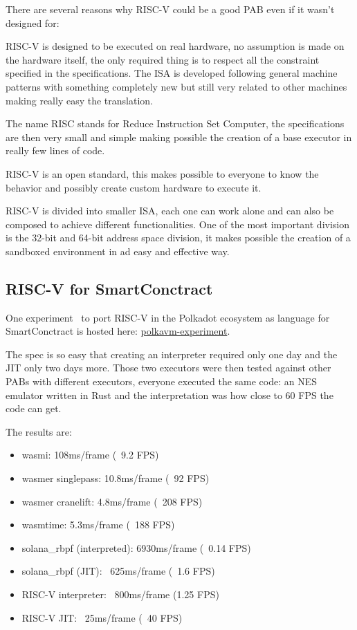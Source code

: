 There are several reasons why RISC-V could be a good PAB even if it wasn't designed for:
\begin{description}[style=nextline]
  \item[Real ISA suitable for direct native hardware implementation]
        RISC-V is designed to be executed on real hardware, no assumption is made on the hardware itself, the only required thing is to respect all the constraint specified in the specifications. The ISA is developed following general machine patterns with something completely new but still very related to other machines making really easy the translation.
  \item[RISC]
        The name RISC stands for Reduce Instruction Set Computer, the specifications are then very small and simple making possible the creation of a base executor in really few lines of code.
  \item[Completely open ISA]
        RISC-V is an open standard, this makes possible to everyone to know the behavior and possibly create custom hardware to execute it.
  \item[ISA separated into a small base integer ISA]
        RISC-V is divided into smaller ISA, each one can work alone and can also be composed to achieve different functionalities. One of the most important division is the 32-bit and 64-bit address space division, it makes possible the creation of a sandboxed environment in ad easy and effective way.
\end{description}

\subsection{RISC-V for SmartConctract}

One experiment~\cite{polkavm-forum} to port RISC-V in the Polkadot ecosystem as language for SmartConctract is hosted here: \href{https://github.com/koute/polkavm-experiment}{polkavm-experiment}.

The spec is so easy that creating an interpreter required only one day and the JIT only two days more. Those two executors were then tested against other PABs with different executors, everyone executed the same code: an NES emulator written in Rust and the interpretation was how close to 60 FPS the code can get.

The results are:
\begin{itemize}
    \item wasmi: 108ms/frame (~9.2 FPS)
    \item wasmer singlepass: 10.8ms/frame (~92 FPS)
    \item wasmer cranelift: 4.8ms/frame (~208 FPS)
    \item wasmtime: 5.3ms/frame (~188 FPS)
    \item solana\_rbpf (interpreted): 6930ms/frame (~0.14 FPS)
    \item solana\_rbpf (JIT): ~625ms/frame (~1.6 FPS)
    \item RISC-V interpreter: ~800ms/frame (1.25 FPS)
    \item RISC-V JIT: ~25ms/frame (~40 FPS)
\end{itemize}

